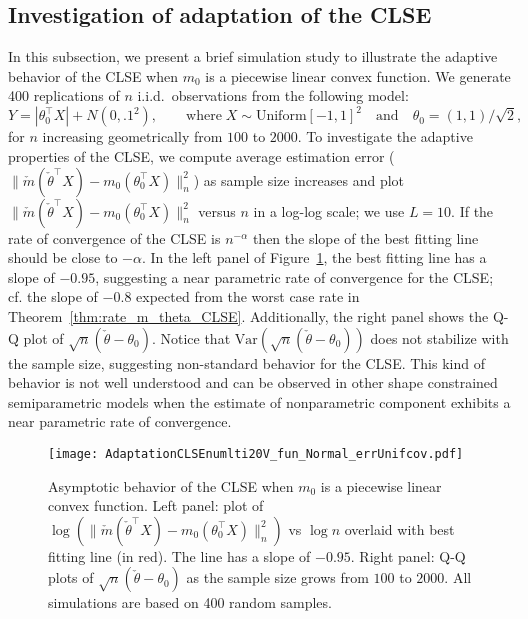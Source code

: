 \subsection{Investigation of adaptation of the CLSE} %
\label{sub:investigation_of_the_adaptation_of_the_clse}
{ In this subsection, we present a brief simulation study to illustrate the adaptive behavior of the CLSE when $m_0$ is a piecewise linear convex function.  We generate 400 replications of $n$ i.i.d.~observations from the following model:
\begin{equation}\label{eq:qqplot_sup}
Y=|\theta_0^\top X| + N(0, .1^2), \qquad \text{where}\; X \sim \text{Uniform} [-1, 1]^2 \quad \text{and}  \quad \theta_0 = (1,1)/\sqrt{2},
\end{equation}
for $n$ increasing geometrically from $100$ to $2000$. To investigate the adaptive properties of the CLSE, we compute average estimation error ($\|\check{m}(\check \theta ^\top X) -m_0(\theta_0^\top X)\|_n^2$) as sample size increases and plot $\|\check{m}(\check \theta ^\top X) -m_0(\theta_0^\top X)\|_n^2$ versus $n$ in a log-log scale; we use $L=10$. If the rate of convergence of the CLSE is $n^{-\alpha}$ then the  slope of the best fitting line should be close to $-\alpha$. In the left panel of Figure~\ref{fig:adap}, the best fitting line has a slope of $-0.95$, suggesting a near parametric rate of convergence for the CLSE; cf. the slope of $-0.8$ expected from the worst case rate in Theorem~\ref{thm:rate_m_theta_CLSE}. Additionally, the right panel shows the Q-Q plot of $\sqrt{n}(\check{\theta}-\theta_0)$. Notice that $\mathrm{Var}(\sqrt{n}(\check{\theta}-\theta_0))$ does not stabilize with the sample size, suggesting non-standard behavior for the CLSE. This kind of behavior is not well understood and can be observed in other shape constrained semiparametric models when the estimate of nonparametric component  exhibits  a near parametric rate of convergence.}
\begin{figure}[!ht]
\centering
\texttt{[image: AdaptationCLSEnumlti20V\_fun\_Normal\_errUnifcov.pdf]}\\ %
\caption[Boxplots of estimates when the truth is a piecewise affine convex function]{Asymptotic behavior of the CLSE when $m_0$ is a piecewise linear convex function. Left panel: plot of $\log(\|\check{m}(\check \theta ^\top X) -m_0(\theta_0^\top X)\|_n^2)$ vs $\log n$ overlaid with best fitting line (in red). The line has a slope of $-0.95$. Right panel: Q-Q plots of $\sqrt{n}(\check{\theta}-\theta_0)$ as the sample size grows from $100$ to $2000$. All simulations are based on 400  random samples.}
\label{fig:adap}

\end{figure}



